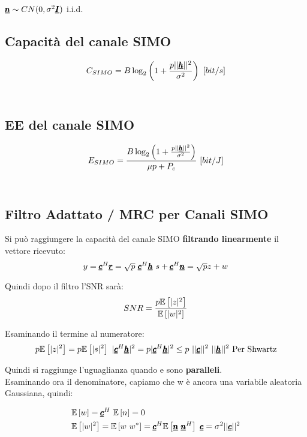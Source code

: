 $\pmb{\underline{n}} \sim  CN(0,\sigma^2 \pmb{\underline{I}})$ i.i.d.
\\

\subsection{Capacità del canale SIMO}
\begin{equation*}
    C_{SIMO} = B\log_2 \left(1 + \frac{p||\pmb{\underline{h}}||^2}{\sigma^2}\right)  \ [bit/s]
\end{equation*}
\\

\subsection{EE del canale SIMO}
\begin{equation*}
    E_{SIMO} = \frac{B\log_2 \left(1 + \frac{p||\vc{h}||^2}{\sigma^2}\right)}{\mu p + P_c}  \ [bit/J]
\end{equation*}
\\

\subsection{Filtro Adattato / MRC per Canali SIMO}
Si può raggiungere la capacità del canale SIMO \textbf{filtrando linearmente} il vettore ricevuto:
\begin{equation*}
    y = \pmb{\underline{c}}^H \pmb{\underline{r}} = \sqrt{p} \ \pmb{\underline{c}}^H \pmb{\underline{h}}\ s + \pmb{\underline{c}}^H \pmb{\underline{n}} = \sqrt{p}z+w
\end{equation*}

Quindi dopo il filtro l'SNR sarà:
\begin{equation*}
    SNR = \frac{p\mathbb{E}\left[|z|^2\right]}{\mathbb{E}\left[|w|^2\right]}
\end{equation*}

Esaminando il termine al numeratore:
\begin{equation*}
   p\mathbb{E}\left[|z|^2\right] = p\mathbb{E}\left[|s|^2\right] \ |\pmb{\underline{c}}^H \pmb{\underline{h}}|^2 = p|\pmb{\underline{c}}^H \pmb{\underline{h}}|^2 \leq p \ ||\pmb{\underline{c}}||^2 \ ||\pmb{\underline{h}}||^2 \ \text{Per Shwartz}
\end{equation*}

Quindi si raggiunge l'uguaglianza quando  e  sono \textbf{paralleli}.\\

Esaminando ora il denominatore, capiamo che w è ancora una variabile aleatoria Gaussiana, quindi:

\begin{equation*}
\begin{aligned}
    &\av{w} = \vc{c}^H \ \av{n} = 0 \\
    &\av{|w|^2} = \av{w \ w^*} = \vc{c}^H \av{\vc{n} \ \vc{n}^H} \ \vc{c} = \sigma^2 ||\vc{c}||^2
\end{aligned}
\end{equation*}

